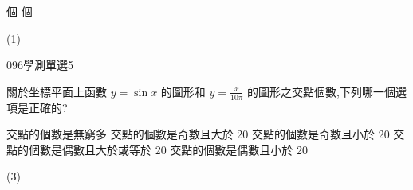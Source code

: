 \begin{QUESTIONS}
\begin{QUESTION}
\begin{QBODY}
\begin{QOPS}
				 個 
				 個
			\end{QOPS}
        \end{QBODY}
        \begin{QFROMS}
        \end{QFROMS}
        \begin{QTAGS}\end{QTAGS}
        \begin{QANS}
            (1)
        \end{QANS}
        \begin{QSOLLIST}
        \end{QSOLLIST}
        \begin{QEMPTYSPACE}
        \end{QEMPTYSPACE}
    \end{QUESTION}
    \begin{QUESTION}
        \begin{ExamInfo}{096}{學測}{單選}{5}
        \end{ExamInfo}
        \begin{ExamAnsRateInfo}{47}{67}{46}{28}
        \end{ExamAnsRateInfo}
        \begin{QBODY}
			關於坐標平面上函數 $y = \sin x$ 的圖形和 $y = \frac{x}{10\pi}$ 的圖形之交點個數,下列哪一個選項是正確的? 
			\begin{QOPS}
				\QOP 交點的個數是無窮多 
				\QOP 交點的個數是奇數且大於 20 
				\QOP 交點的個數是奇數且小於 20 
				\QOP 交點的個數是偶數且大於或等於 20 
				\QOP 交點的個數是偶數且小於 20
			\end{QOPS}
        \end{QBODY}
        \begin{QFROMS}
        \end{QFROMS}
        \begin{QTAGS}\end{QTAGS}
        \begin{QANS}
            (3)
        \end{QANS}
        \begin{QSOLLIST}
        \end{QSOLLIST}
        \begin{QEMPTYSPACE}
        \end{QEMPTYSPACE}
    \end{QUESTION}
\end{QUESTIONS}
